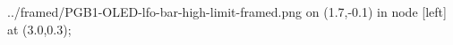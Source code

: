 \documentclass[preview]{standalone}
\begin{document}
\begin{zoomed}{../framed/PGB1-OLED-lfo-bar-high-limit-framed.png}
  \spy [gray, size=1.0cm] on (1.7,-0.1) in node [left] at (3.0,0.3);
\end{zoomed}
\end{document}
